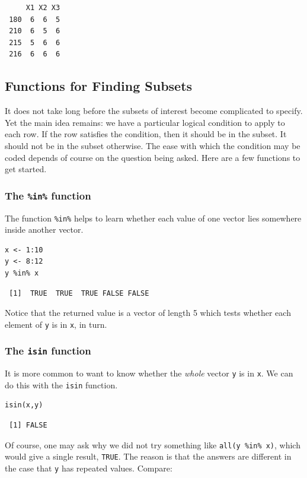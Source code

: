 \documentclass[captions=tableheading]{scrbook}
\begin{document}
\begin{verbatim}
     X1 X2 X3
 180  6  6  5
 210  6  5  6
 215  5  6  6
 216  6  6  6
\end{verbatim}
\subsection{Functions for Finding Subsets}
\label{sec-4-2-2}


It does not take long before the subsets of interest become complicated to specify. Yet the main idea remains: we have a particular logical condition to apply to each row. If the row satisfies the condition, then it should be in the subset. It should not be in the subset otherwise. The ease with which the condition may be coded depends of course on the question being asked. Here are a few functions to get started.
\subsubsection{The \texttt{\%in\%} function}
\label{sec-4-2-2-1}


The function \texttt{\%in\%} helps to learn whether each value of one vector lies somewhere inside another vector. 


\begin{verbatim}
x <- 1:10 
y <- 8:12 
y %in% x
\end{verbatim}

\begin{verbatim}
 [1]  TRUE  TRUE  TRUE FALSE FALSE
\end{verbatim}

Notice that the returned value is a vector of length 5 which tests whether each element of \texttt{y} is in \texttt{x}, in turn.
\subsubsection{The \texttt{isin} function}
\label{sec-4-2-2-2}


It is more common to want to know whether the \emph{whole} vector \texttt{y} is in \texttt{x}. We can do this with the \texttt{isin} function. 


\begin{verbatim}
isin(x,y)
\end{verbatim}

\begin{verbatim}
 [1] FALSE
\end{verbatim}

Of course, one may ask why we did not try something like \texttt{all(y \%in\% x)}, which would give a single result, \texttt{TRUE}. The reason is that the answers are different in the case that \texttt{y} has repeated values. Compare: 
\end{document}
